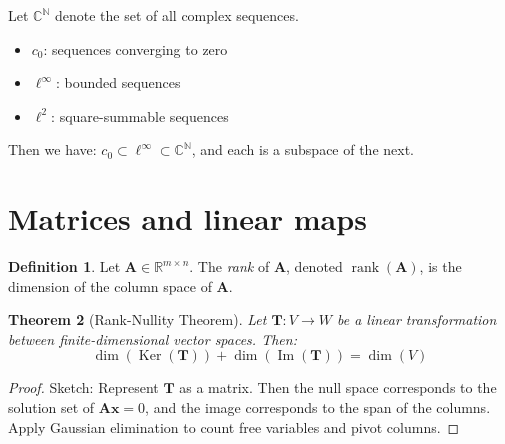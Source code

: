 \documentclass[11pt]{article}
\newcommand{\R}{\mathbb{R}}
\newcommand{\C}{\mathbb{C}}
\newcommand{\N}{\mathbb{N}}
\newcommand{\vect}[1]{\bm{#1}}
\newcommand{\mat}[1]{\bm{#1}}
\DeclareMathOperator{\Ker}{Ker}
\DeclareMathOperator{\Img}{Im}
\DeclareMathOperator{\rank}{rank}
\theoremstyle{definition}
\newtheorem{definition}{Definition}[section]
\theoremstyle{plain}
\newtheorem{theorem}[definition]{Theorem}
\theoremstyle{remark}
\begin{document}
Let \( \C^\N \) denote the set of all complex sequences.

\begin{itemize}
    \item \( c_0 \): sequences converging to zero
    \item \( \ell^\infty \): bounded sequences
    \item \( \ell^2 \): square-summable sequences
\end{itemize}

Then we have: \( c_0 \subset \ell^\infty \subset \C^\N \), and each is a subspace of the next.

\section{Matrices and linear maps}

\begin{definition}
    Let \( \mat{A} \in \R^{m \times n} \). The \emph{rank} of \( \mat{A} \), denoted \( \rank(\mat{A}) \), is the dimension of the column
    space of \( \mat{A} \).
\end{definition}

\begin{theorem}[Rank-Nullity Theorem]
    Let \( \mat{T}: V \to W \) be a linear transformation between finite-dimensional vector spaces. Then:
    \[
        \dim(\Ker(\mat{T})) + \dim(\Img(\mat{T})) = \dim(V)
    \]
\end{theorem}

\begin{proof}
    Sketch: Represent \( \mat{T} \) as a matrix. Then the null space corresponds to the solution set of \( \mat{A}\vect{x} = 0 \), and the
    image corresponds to the span of the columns. Apply Gaussian elimination to count free variables and pivot columns.
\end{proof}
\end{document}
